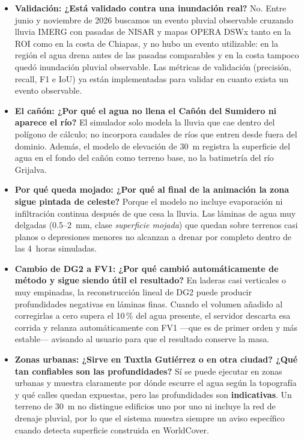 \documentclass[11pt,letterpaper]{article}
\begin{document}
\begin{itemize}
  \item \textbf{Validación: ¿Está validado contra una inundación real?}
  No. Entre junio y noviembre de 2026 buscamos un evento pluvial observable cruzando lluvia IMERG con pasadas de NISAR y mapas OPERA DSWx tanto en la ROI como en la costa de Chiapas, y no hubo un evento utilizable: en la región el agua drena antes de las pasadas comparables y en la costa tampoco quedó inundación pluvial observable. Las métricas de validación (precisión, recall, F1 e IoU) ya están implementadas para validar en cuanto exista un evento observable.

  \item \textbf{El cañón: ¿Por qué el agua no llena el Cañón del Sumidero ni aparece el río?}
  El simulador solo modela la lluvia que cae dentro del polígono de cálculo; no incorpora caudales de ríos que entren desde fuera del dominio. Además, el modelo de elevación de 30~m registra la superficie del agua en el fondo del cañón como terreno base, no la batimetría del río Grijalva.

  \item \textbf{Por qué queda mojado: ¿Por qué al final de la animación la zona sigue pintada de celeste?}
  Porque el modelo no incluye evaporación ni infiltración continua después de que cesa la lluvia. Las láminas de agua muy delgadas (0.5--2~mm, clase \emph{superficie mojada}) que quedan sobre terrenos casi planos o depresiones menores no alcanzan a drenar por completo dentro de las 4~horas simuladas.

  \item \textbf{Cambio de DG2 a FV1: ¿Por qué cambió automáticamente de método y sigue siendo útil el resultado?}
  En laderas casi verticales o muy empinadas, la reconstrucción lineal de DG2 puede producir profundidades negativas en láminas finas. Cuando el volumen añadido al corregirlas a cero supera el 10\,\% del agua presente, el servidor descarta esa corrida y relanza automáticamente con FV1 ---que es de primer orden y más estable--- avisando al usuario para que el resultado conserve la masa.

  \item \textbf{Zonas urbanas: ¿Sirve en Tuxtla Gutiérrez o en otra ciudad? ¿Qué tan confiables son las profundidades?}
  Sí se puede ejecutar en zonas urbanas y muestra claramente por dónde escurre el agua según la topografía y qué calles quedan expuestas, pero las profundidades son \textbf{indicativas}. Un terreno de 30~m no distingue edificios uno por uno ni incluye la red de drenaje pluvial, por lo que el sistema muestra siempre un aviso específico cuando detecta superficie construida en WorldCover.


\end{itemize}
\end{document}
